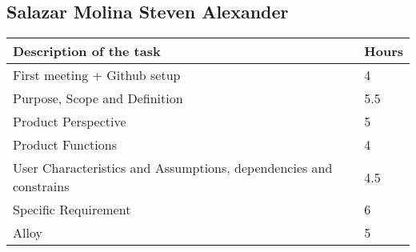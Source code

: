 \subsection{Salazar Molina Steven Alexander}
\begin{center}
\renewcommand{\arraystretch}{1.5}

\begin{tabular}{ |m{7cm}|m{2cm}| } 
 \hline
 \textbf{Description of the task}  & \textbf{Hours} \\
 \hline
 First meeting + Github setup & 4 \\
 \hline
 Purpose, Scope and Definition & 5.5 \\
 \hline
 Product Perspective & 5 \\ 
 \hline
 Product Functions & 4 \\ 
 \hline 
 User Characteristics and Assumptions, dependencies and constrains & 4.5 \\  
 \hline
 Specific Requirement & 6 \\
 \hline
 Alloy &  5\\
 \hline
\end{tabular}
\end{center}
